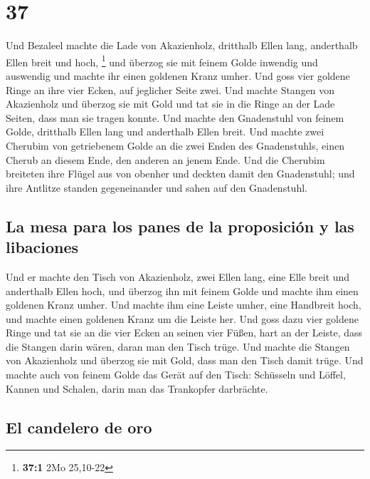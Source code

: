 \hypertarget{section-36}{%
\section{37}\label{section-36}}

 Und Bezaleel machte die Lade von Akazienholz, dritthalb
Ellen lang, anderthalb Ellen breit und hoch, \footnote{\textbf{37:1} 2Mo
  25,10-22}  und überzog sie mit feinem Golde inwendig und
auswendig und machte ihr einen goldenen Kranz umher.  Und
goss vier goldene Ringe an ihre vier Ecken, auf jeglicher Seite zwei.
 Und machte Stangen von Akazienholz und überzog sie mit
Gold  und tat sie in die Ringe an der Lade Seiten, dass
man sie tragen konnte.  Und machte den Gnadenstuhl von
feinem Golde, dritthalb Ellen lang und anderthalb Ellen breit.
 Und machte zwei Cherubim von getriebenem Golde an die
zwei Enden des Gnadenstuhls,  einen Cherub an diesem Ende,
den anderen an jenem Ende.  Und die Cherubim breiteten
ihre Flügel aus von obenher und deckten damit den Gnadenstuhl; und ihre
Antlitze standen gegeneinander und sahen auf den Gnadenstuhl.

\hypertarget{la-mesa-para-los-panes-de-la-proposiciuxf3n-y-las-libaciones}{%
\subsection{La mesa para los panes de la proposición y las
libaciones}\label{la-mesa-para-los-panes-de-la-proposiciuxf3n-y-las-libaciones}}

 Und er machte den Tisch von Akazienholz, zwei Ellen
lang, eine Elle breit und anderthalb Ellen hoch,  und
überzog ihn mit feinem Golde und machte ihm einen goldenen Kranz umher.
 Und machte ihm eine Leiste umher, eine Handbreit hoch,
und machte einen goldenen Kranz um die Leiste her.  Und
goss dazu vier goldene Ringe und tat sie an die vier Ecken an seinen
vier Füßen,  hart an der Leiste, dass die Stangen darin
wären, daran man den Tisch trüge.  Und machte die Stangen
von Akazienholz und überzog sie mit Gold, dass man den Tisch damit
trüge.  Und machte auch von feinem Golde das Gerät auf
den Tisch: Schüsseln und Löffel, Kannen und Schalen, darin man das
Trankopfer darbrächte.

\hypertarget{el-candelero-de-oro}{%
\subsection{El candelero de oro}\label{el-candelero-de-oro}}

